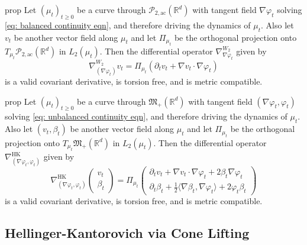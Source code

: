 \documentclass{article}
\newcommand{\pac}{\mathcal{P}_{2, \text{ac}}(\mathbb{R}^d)}
\newcommand{\posm}{\mathfrak{M}_+(\mathbb{R}^d)}
\begin{document}
\begin{restatable}{prop}{} \label{Wasserstein covariant deriv}
    Let $(\mu_t)_{t\geq 0}$ be a curve through $\pac$ with tangent field $\nabla \varphi_t$ solving \cref{eq: balanced continuity eqn}, and therefore driving the dynamics of $\mu_t$. Also let $v_t$ be another vector field along $\mu_t$ and let $\Pi_{\mu_t}$ be the orthogonal projection onto $T_{\mu_t}\pac$ in $L_2(\mu_t)$. Then the differential operator $\nabla_{\nabla\varphi_t}^{W_2}$ given by
    \begin{equation*}
        \nabla_{(\nabla\varphi_t)}^{W_2}v_t = \Pi_{\mu_t}\left(\partial_t v_t + \nabla v_t \cdot \nabla \varphi_t\right)
    \end{equation*}
    is a valid covariant derivative, is torsion free, and is metric compatible. 
\end{restatable}

\begin{restatable}{prop}{} \label{HK covariant deriv}
    Let $(\mu_t)_{t\geq 0}$ be a curve through $\posm$ with tangent field $(\nabla \varphi_t, \varphi_t)$ solving \cref{eq: unbalanced continuity eqn}, and therefore driving the dynamics of $\mu_t$. Also let $(v_t, \beta_t)$ be another vector field along $\mu_t$ and let $\Pi_{\mu_t}$ be the orthogonal projection onto $T_{\mu_t}\posm$ in $L_2(\mu_t)$. Then the differential operator $\nabla_{(\nabla\varphi_t, \varphi_t)}^{\text{HK}}$ given by
    \begin{equation*}
        \nabla_{(\nabla\varphi_t, \varphi_t)}^{\text{HK}} \begin{pmatrix}
            v_t \\
            \beta_t
        \end{pmatrix} = \Pi_{\mu_t}\begin{pmatrix}
            \partial_t v_t + \nabla v_t \cdot \nabla \varphi_t + 2\beta_t\nabla\varphi_t \\
            \partial_t \beta_t + \frac{1}{2}\langle \nabla \beta_t, \nabla \varphi_t\rangle + 2\varphi_t\beta_t
        \end{pmatrix}
    \end{equation*}
    is a valid covariant derivative, is torsion free, and is metric compatible. 
\end{restatable}

\subsection{Hellinger-Kantorovich via Cone Lifting}
\end{document}
